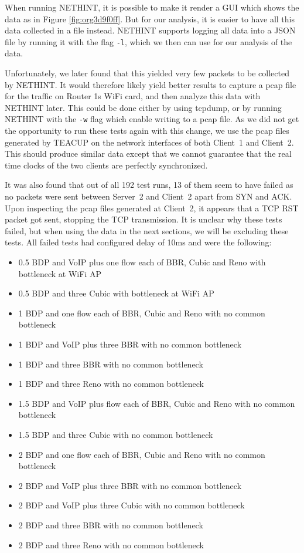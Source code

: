 \documentclass[a4paper,11pt]{article}
\begin{document}
When running NETHINT, it is possible to make it render a GUI which shows the data as in Figure \ref{fig:org3d9f0ff}. But for our analysis, it is easier to have all this data collected in a file instead. NETHINT supports logging all data into a JSON file by running it with the flag \texttt{-l}, which we then can use for our analysis of the data.

Unfortunately, we later found that this yielded very few packets to be collected by NETHINT. It would therefore likely yield better results to capture a pcap file for the traffic on Router 1s WiFi card, and then analyze this data with NETHINT later. This could be done either by using tcpdump, or by running NETHINT with the \texttt{-w} flag which enable writing to a pcap file. As we did not get the opportunity to run these tests again with this change, we use the pcap files generated by TEACUP on the network interfaces of both Client~1 and Client~2. This should produce similar data except that we cannot guarantee that the real time clocks of the two clients are perfectly synchronized.

It was also found that out of all 192 test runs, 13 of them seem to have failed as no packets were sent between Server~2 and Client~2 apart from SYN and ACK. Upon inspecting the pcap files generated at Client~2, it appears that a TCP RST packet got sent, stopping the TCP transmission. It is unclear why these tests failed, but when using the data in the next sections, we will be excluding these tests. All failed tests had configured delay of 10ms and were the following:

\begin{itemize}
\item 0.5 BDP and VoIP plus one flow each of BBR, Cubic and Reno with bottleneck at WiFi AP
\item 0.5 BDP and three Cubic with bottleneck at WiFi AP
\item 1 BDP and one flow each of BBR, Cubic and Reno with no common bottleneck
\item 1 BDP and VoIP plus three BBR with no common bottleneck
\item 1 BDP and three BBR with no common bottleneck
\item 1 BDP and three Reno with no common bottleneck
\item 1.5 BDP and VoIP plus flow each of BBR, Cubic and Reno with no common bottleneck
\item 1.5 BDP and three Cubic with no common bottleneck
\item 2 BDP and one flow each of BBR, Cubic and Reno with no common bottleneck
\item 2 BDP and VoIP plus three BBR with no common bottleneck
\item 2 BDP and VoIP plus three Cubic with no common bottleneck
\item 2 BDP and three BBR with no common bottleneck
\item 2 BDP and three Reno with no common bottleneck
\end{itemize}
\end{document}
